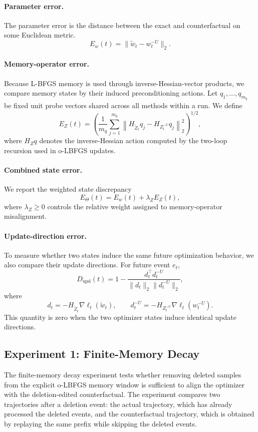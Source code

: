 \documentclass{ssl}
\begin{document}
\paragraph{Parameter error.}
The parameter error is the distance between the exact and counterfactual on some Euclidean metric.
\[
E_w(t)=\|\tilde w_t-w_t^{-U}\|_2.
\]

\paragraph{Memory-operator error.}
Because L-BFGS memory is used through inverse-Hessian-vector products, we compare memory states by their induced preconditioning actions. Let \(q_1,\ldots,q_{m_q}\) be fixed unit probe vectors shared across all methods within a run. We define
\[
E_Z(t)
=
\left(
\frac{1}{m_q}
\sum_{j=1}^{m_q}
\left\|
H_{\tilde Z_t}q_j
-
H_{Z_t^{-U}}q_j
\right\|_2^2
\right)^{1/2},
\]
where \(H_Zq\) denotes the inverse-Hessian action computed by the two-loop recursion used in o-LBFGS updates.

\paragraph{Combined state error.}
We report the weighted state discrepancy
\[
E_\Theta(t)=E_w(t)+\lambda_Z E_Z(t),
\]
where \(\lambda_Z\geq0\) controls the relative weight assigned to memory-operator misalignment.

\paragraph{Update-direction error.}
To measure whether two states induce the same future optimization behavior, we also compare their update directions. For future event \(e_t\),
\[
D_{\mathrm{upd}}(t)
=
1-
\frac{
d_t^\top d_t^{-U}
}{
\|d_t\|_2\|d_t^{-U}\|_2
},
\]
where
\[
d_t=-H_{\tilde Z_t}\nabla \ell_t(\tilde w_t),
\qquad
d_t^{-U}=-H_{Z_t^{-U}}\nabla \ell_t(w_t^{-U}).
\]
This quantity is zero when the two optimizer states induce identical update directions.

\subsection{Experiment 1: Finite-Memory Decay}
The finite-memory decay experiment tests whether removing deleted samples from the explicit o-LBFGS memory window is sufficient to align the optimizer with the deletion-edited counterfactual. The experiment compares two trajectories after a deletion event: the actual trajectory, which has already processed the deleted events, and the counterfactual trajectory, which is obtained by replaying the same prefix while skipping the deleted events.
\end{document}
